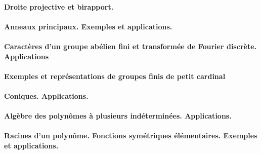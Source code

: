 \paragraph{Droite projective et birapport.}
\paragraph{Anneaux principaux. Exemples et applications.}
\paragraph{Caractères d'un groupe abélien fini et transformée de Fourier discrète. Applications}
\paragraph{Exemples et représentations de groupes finis de petit cardinal}
\paragraph{Coniques. Applications.}
\paragraph{Algèbre des polynômes à plusieurs indéterminées. Applications.}
\paragraph{Racines d’un polynôme. Fonctions symétriques élémentaires. Exemples et applications.}
